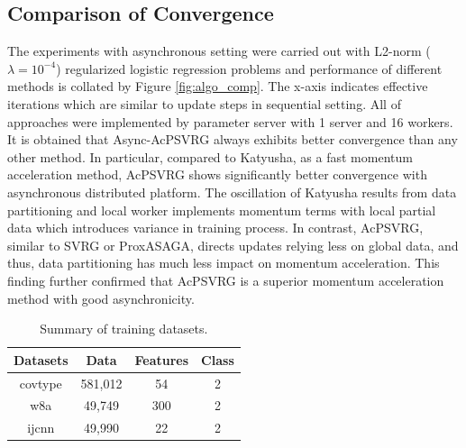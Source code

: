 \subsection{Comparison of Convergence}
The experiments with asynchronous setting were carried out with L2-norm ($\lambda = 10^{-4}$) regularized logistic regression problems and performance of different methods is collated by Figure \ref{fig:algo_comp}. The x-axis indicates effective iterations which are similar to update steps in sequential setting. All of approaches were implemented by parameter server with 1 server and 16 workers. It is obtained that Async-AcPSVRG always exhibits better convergence than any other method. In particular, compared to Katyusha, as a fast momentum acceleration method, AcPSVRG shows significantly better convergence with asynchronous distributed platform. The oscillation of Katyusha results from data partitioning and local worker implements momentum terms with local partial data which introduces variance in training process. In contrast, AcPSVRG, similar to SVRG or ProxASAGA, directs updates relying less on global data, and thus, data partitioning has much less impact on momentum acceleration. This finding further confirmed that AcPSVRG is a superior momentum acceleration method with good asynchronicity.  


\begin{table}
\begin{center}
\caption{Summary of training datasets.}
\begin{tabular}{ c|c|c|c } 
 \hline
 Datasets &  Data & Features & Class  \\ 
 \hline
  covtype & 581,012 & 54 & 2 \\ 
 w8a & 49,749  & 300 & 2 \\ 
 ijcnn & 49,990 & 22 & 2 \\
 \hline
\end{tabular}
\label{metadata}
\end{center}
\end{table}

